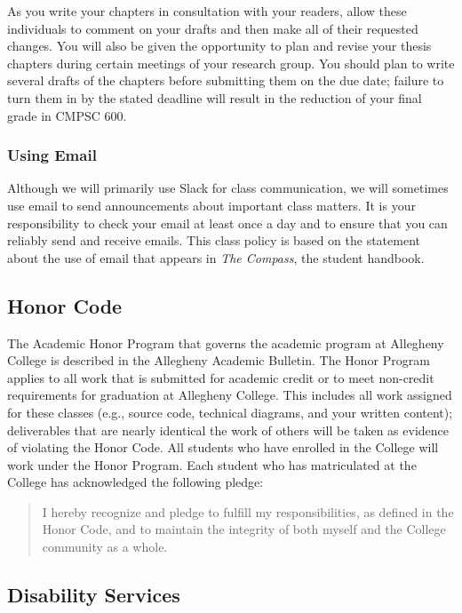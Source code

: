 \documentclass[11pt]{article}
\begin{document}
As you write your chapters in consultation with your readers, allow these individuals to comment on your drafts and then make all of their requested
changes. You will also be given the opportunity to plan and revise your thesis chapters during certain meetings of your research group. You should plan to write several drafts of the chapters before submitting them on the due date; failure to turn them in by the stated deadline will result in the reduction of your final grade in CMPSC 600.

\subsubsection*{Using Email}

Although we will primarily use Slack for class communication, we will sometimes use email to send announcements about important class matters. It is your responsibility to check your email at least once a day and to ensure that you can reliably send and receive emails. This class policy is based on the statement about the use of email that appears in {\em The Compass}, the student handbook.

\subsection*{Honor Code}

The Academic Honor Program that governs the academic program at Allegheny
College is described in the Allegheny Academic Bulletin. The Honor Program
applies to all work that is submitted for academic credit or to meet non-credit
requirements for graduation at Allegheny College. This includes all work
assigned for these classes (e.g., source code, technical diagrams, and your
written content); deliverables that are nearly identical the work of others will
be taken as evidence of violating the Honor Code. All students who have enrolled
in the College will work under the Honor Program. Each student who has
matriculated at the College has acknowledged the following pledge:

\begin{quote}
I hereby recognize and pledge to fulfill my responsibilities, as defined in the Honor Code, and to maintain the
integrity of both myself and the College community as a whole.
\end{quote}

\subsection*{Disability Services}
\end{document}
